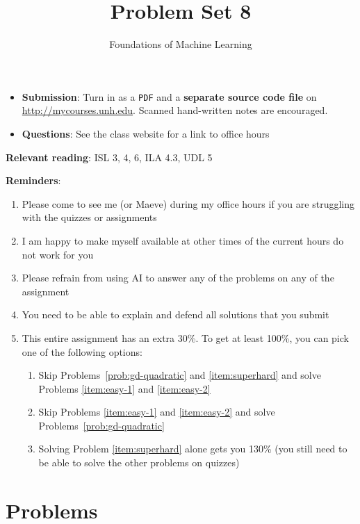 \documentclass[letterpaper]{article}
\title{Problem Set 8}
\author{Foundations of Machine Learning}
\date{}
\begin{document}
\maketitle

\begin{itemize}
\item \textbf{Submission}: Turn in as a \texttt{PDF} and a \textbf{separate source code file} on \url{http://mycourses.unh.edu}. Scanned hand-written notes are encouraged.
\item \textbf{Questions}: See the class website for a link to office hours
\end{itemize}

\textbf{Relevant reading}: ISL 3, 4, 6, ILA 4.3, UDL 5

\textbf{Reminders}:
\begin{enumerate}
\item Please come to see me (or Maeve) during my office hours if you are struggling with the quizzes or assignments
\item I am happy to make myself available at other times of the current hours do not work for you
\item Please refrain from using AI to answer any of the problems on any of the assignment
\item You need to be able to explain and defend all solutions that you submit 
\item This entire assignment has an extra 30\%. To get at least 100\%, you can pick one of the following options:
  \begin{enumerate}
  \item Skip Problems~\ref{prob:gd-quadratic} and \ref{item:superhard} and solve Problems \ref{item:easy-1} and \ref{item:easy-2}
  \item Skip Problems \ref{item:easy-1} and \ref{item:easy-2} and solve Problems~\ref{prob:gd-quadratic} 
  \item Solving Problem \ref{item:superhard} alone gets you 130\% (you still need to be able to solve the other problems on quizzes)
  \end{enumerate}
\end{enumerate}

\section*{Problems}
\end{document}
